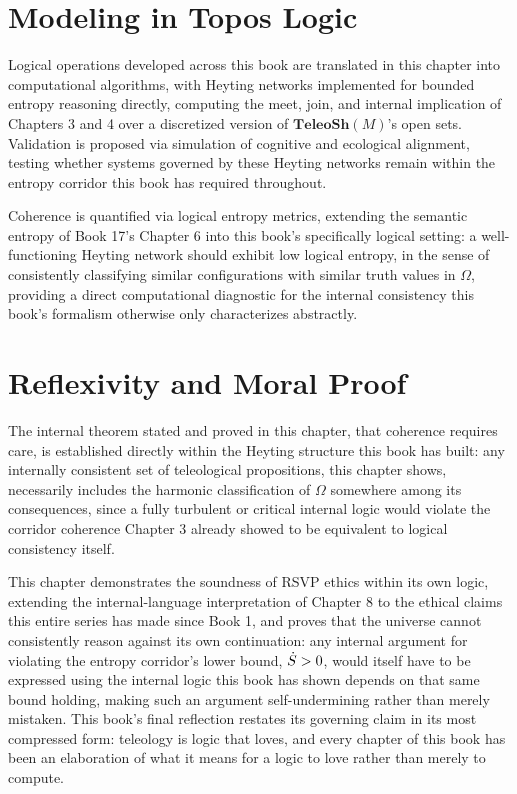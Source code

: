\chapter{Modeling in Topos Logic}

Logical operations developed across this book are translated in this chapter into computational algorithms, with Heyting networks implemented for bounded entropy reasoning directly, computing the meet, join, and internal implication of Chapters 3 and 4 over a discretized version of $\mathbf{TeleoSh}(M)$'s open sets. Validation is proposed via simulation of cognitive and ecological alignment, testing whether systems governed by these Heyting networks remain within the entropy corridor this book has required throughout.

Coherence is quantified via logical entropy metrics, extending the semantic entropy of Book 17's Chapter 6 into this book's specifically logical setting: a well-functioning Heyting network should exhibit low logical entropy, in the sense of consistently classifying similar configurations with similar truth values in $\Omega$, providing a direct computational diagnostic for the internal consistency this book's formalism otherwise only characterizes abstractly.

\chapter{Reflexivity and Moral Proof}

The internal theorem stated and proved in this chapter, that coherence requires care, is established directly within the Heyting structure this book has built: any internally consistent set of teleological propositions, this chapter shows, necessarily includes the harmonic classification of $\Omega$ somewhere among its consequences, since a fully turbulent or critical internal logic would violate the corridor coherence Chapter 3 already showed to be equivalent to logical consistency itself.

This chapter demonstrates the soundness of RSVP ethics within its own logic, extending the internal-language interpretation of Chapter 8 to the ethical claims this entire series has made since Book 1, and proves that the universe cannot consistently reason against its own continuation: any internal argument for violating the entropy corridor's lower bound, $\dot{S} > 0$, would itself have to be expressed using the internal logic this book has shown depends on that same bound holding, making such an argument self-undermining rather than merely mistaken. This book's final reflection restates its governing claim in its most compressed form: teleology is logic that loves, and every chapter of this book has been an elaboration of what it means for a logic to love rather than merely to compute.

